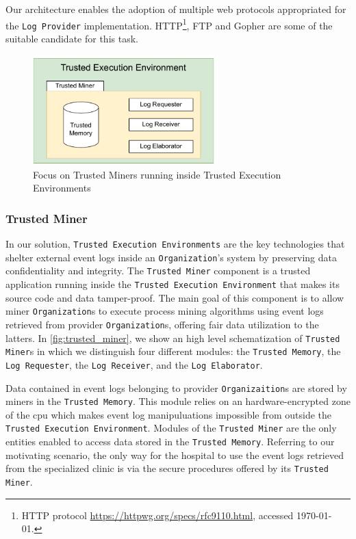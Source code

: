 Our architecture enables the adoption of multiple web protocols appropriated for the \texttt{Log Provider} implementation. HTTP\footnote{HTTP protocol \url{https://httpwg.org/specs/rfc9110.html}, accessed \today.}, FTP and Gopher are some of the suitable candidate for this task.
\label{fig:trusted_miner}
\begin{figure}[t]
\centering
\includegraphics[width=7cm]{content/figures/Trusted_miner.pdf}
\caption{Focus on Trusted Miners running inside Trusted Execution Environments}
\label{fig:implementation}
\end{figure}
\subsubsection{Trusted Miner}
In our solution, \texttt{Trusted Execution Environments} are the key technologies that shelter external event logs inside an \texttt{Organization}'s system by preserving data confidentiality and integrity. The \texttt{Trusted Miner} component is a trusted application running inside the \texttt{Trusted Execution Environment} that makes its source code and data tamper-proof. The main goal of this component is to allow miner \texttt{Organization}s to execute process mining algorithms using %
event logs retrieved from provider \texttt{Organization}s, offering fair data utilization to the latters. In \cref{fig:trusted_miner}, we show an high level schematization of \texttt{Trusted Miner}s in which we distinguish four different modules: the \texttt{Trusted Memory}, the \texttt{Log Requester}, the \texttt{Log Receiver}, and the \texttt{Log Elaborator}.

Data contained in event logs belonging to provider \texttt{Organizaition}s are stored by miners in the \texttt{Trusted Memory}. This module relies on an hardware-encrypted zone of the cpu which makes event log manipuluations impossible from outside the \texttt{Trusted Execution Environment}. Modules of the \texttt{Trusted Miner} are the only entities enabled to access data stored in the \texttt{Trusted Memory}. Referring to our motivating scenario, the only way for the hospital to use the event logs retrieved from the specialized clinic is via the secure procedures offered by its \texttt{Trusted Miner}.

